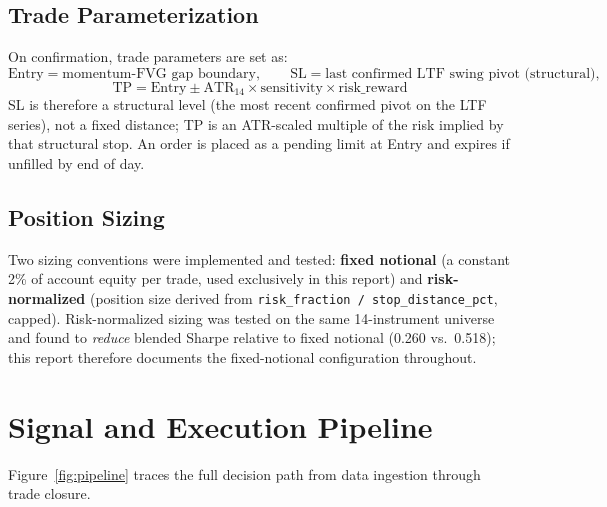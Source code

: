 \documentclass[11pt]{article}
\begin{document}
\subsection{Trade Parameterization}
\label{sec:params}
On confirmation, trade parameters are set as:
\[
\text{Entry} = \text{momentum-FVG gap boundary}, \qquad
\text{SL} = \text{last confirmed LTF swing pivot (structural)},
\]
\[
\text{TP} = \text{Entry} \pm \mathrm{ATR}_{14}\times\text{sensitivity}\times\text{risk\_reward}
\]
SL is therefore a structural level (the most recent confirmed pivot on the LTF series), not a fixed
distance; TP is an ATR-scaled multiple of the risk implied by that structural stop. An order is placed
as a pending limit at Entry and expires if unfilled by end of day.

\subsection{Position Sizing}
\label{sec:sizing}
Two sizing conventions were implemented and tested: \textbf{fixed notional} (a constant 2\% of account
equity per trade, used exclusively in this report) and \textbf{risk-normalized} (position size derived
from \texttt{risk\_fraction / stop\_distance\_pct}, capped). Risk-normalized sizing was tested on the
same 14-instrument universe and found to \emph{reduce} blended Sharpe relative to fixed notional
(0.260 vs.\ 0.518); this report therefore documents the fixed-notional configuration throughout.

\clearpage
\section{Signal and Execution Pipeline}
\label{sec:diagram}
Figure~\ref{fig:pipeline} traces the full decision path from data ingestion through trade closure.
\end{document}
